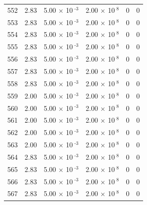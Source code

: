 \documentclass[a4paper,11pt]{article}
\begin{document}
\begin{center}
\begin{longtable}{|R{1.5cm}|R{2.4cm}|R{2.4cm}|R{2.4cm}|R{2.4cm}|R{2.4cm}|}
  552 &   2.83  &         5.00 $\times$ 10$^{\text{          -3}}$  &         2.00 $\times$ 10$^{\text{           8}}$  & 0  & 0 \\
  553 &   2.83  &         5.00 $\times$ 10$^{\text{          -3}}$  &         2.00 $\times$ 10$^{\text{           8}}$  & 0  & 0 \\
  554 &   2.83  &         5.00 $\times$ 10$^{\text{          -3}}$  &         2.00 $\times$ 10$^{\text{           8}}$  & 0  & 0 \\
  555 &   2.83  &         5.00 $\times$ 10$^{\text{          -3}}$  &         2.00 $\times$ 10$^{\text{           8}}$  & 0  & 0 \\
  556 &   2.83  &         5.00 $\times$ 10$^{\text{          -3}}$  &         2.00 $\times$ 10$^{\text{           8}}$  & 0  & 0 \\
  557 &   2.83  &         5.00 $\times$ 10$^{\text{          -3}}$  &         2.00 $\times$ 10$^{\text{           8}}$  & 0  & 0 \\
  558 &   2.83  &         5.00 $\times$ 10$^{\text{          -3}}$  &         2.00 $\times$ 10$^{\text{           8}}$  & 0  & 0 \\
  559 &   2.00  &         5.00 $\times$ 10$^{\text{          -3}}$  &         2.00 $\times$ 10$^{\text{           8}}$  & 0  & 0 \\
  560 &   2.00  &         5.00 $\times$ 10$^{\text{          -3}}$  &         2.00 $\times$ 10$^{\text{           8}}$  & 0  & 0 \\
  561 &   2.00  &         5.00 $\times$ 10$^{\text{          -3}}$  &         2.00 $\times$ 10$^{\text{           8}}$  & 0  & 0 \\
  562 &   2.00  &         5.00 $\times$ 10$^{\text{          -3}}$  &         2.00 $\times$ 10$^{\text{           8}}$  & 0  & 0 \\
  563 &   2.00  &         5.00 $\times$ 10$^{\text{          -3}}$  &         2.00 $\times$ 10$^{\text{           8}}$  & 0  & 0 \\
  564 &   2.83  &         5.00 $\times$ 10$^{\text{          -3}}$  &         2.00 $\times$ 10$^{\text{           8}}$  & 0  & 0 \\
  565 &   2.83  &         5.00 $\times$ 10$^{\text{          -3}}$  &         2.00 $\times$ 10$^{\text{           8}}$  & 0  & 0 \\
  566 &   2.83  &         5.00 $\times$ 10$^{\text{          -3}}$  &         2.00 $\times$ 10$^{\text{           8}}$  & 0  & 0 \\
  567 &   2.83  &         5.00 $\times$ 10$^{\text{          -3}}$  &         2.00 $\times$ 10$^{\text{           8}}$  & 0  & 0 \\

\end{longtable}
\end{center}
\end{document}
